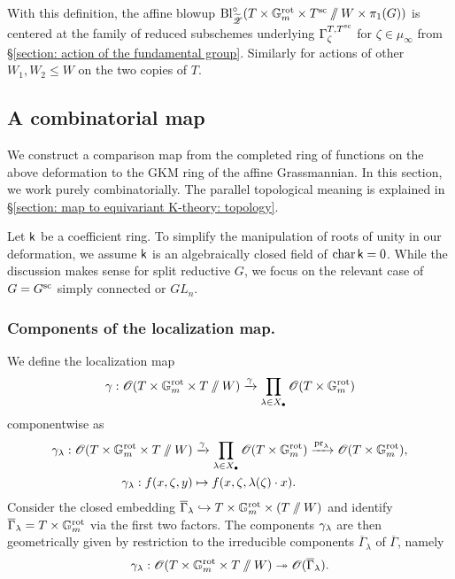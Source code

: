 With this definition, the affine blowup $\Bl^{\circ}_{\widetilde{\eZ}}(T \times \Gm^{\rot} \times T^{\sc} \sslash W \times \pi_1(G))$ is centered at the family of reduced subschemes underlying $\Gamma^{T, T^{\sc}}_{\zeta}$ for $\zeta \in \mu_{\infty}$ from \S \ref{section: action of the fundamental group}. Similarly for actions of other $W_1, W_2 \leq W$ on the two copies of $T$.





\subsection{A combinatorial map}\label{section: map to equivariant K-theory: combinatorics}
We construct a comparison map from the completed ring of functions on the above deformation to the GKM ring of the affine Grassmannian. In this section, we work purely combinatorially. The parallel topological meaning is explained in \S \ref{section: map to equivariant K-theory: topology}. 

Let $\k$ be a coefficient ring. To simplify the manipulation of roots of unity in our deformation, we assume $\k$ is an algebraically closed field of $\chara \k = 0$. While the discussion makes sense for split reductive $G$, we focus on the relevant case of $G=G^{\sc}$ simply connected or $GL_n$.


\subsubsection{Components of the localization map.}
We define the localization map $$\loc: \O(T \times \Gm^{\rot} \times T \sslash W) \xrightarrow{\loc} \prod_{\lambda \in X_{\bullet}} \O(T \times \Gm^{\rot})$$ componentwise as
\begin{align}\label{equation: combinatorial localization map}
   \loc_{\lambda}: \O(T \times \Gm^{\rot} \times T \sslash W) &\xrightarrow{\loc} \prod_{\lambda \in X_{\bullet}} \O(T \times \Gm^{\rot}) \xrightarrow{\pr_{\lambda}} \O(T \times \Gm^{\rot}), \\   
   \gamma_{\lambda}: f(x, \zeta, y) &\mapsto f(x, \zeta, \lambda(\zeta) \cdot x).
\end{align}
%
Consider the closed embedding $\overline{\Gamma}_{\lambda} \hookrightarrow T \times \Gm^{\rot} \times (T \sslash W)$ and identify $\overline{\Gamma}_{\lambda} = T \times \Gm^{\rot}$ via the first two factors. The components $\loc_{\lambda}$ are then geometrically given by restriction to the irreducible components $\overline{\Gamma}_{\lambda}$ of $\overline{\Gamma}$, namely
\begin{equation}
   \loc_{\lambda}: \O(T \times \Gm^{\rot} \times T \sslash W) \twoheadrightarrow \O(\overline{\Gamma}_{\lambda}).
\end{equation}

